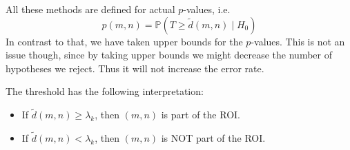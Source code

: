 \documentclass{beamer}
\begin{document}
\begin{frame}
	All these methods are defined for actual $p$-values, i.e.
	\begin{equation*}
		p(m, n) = \mathbb{P}(T \geq \tilde{d}(m, n) \mid H_0)
	\end{equation*}
	In contrast to that, we have taken upper bounds for the $p$-values. This is not an issue though, since by taking upper bounds we might decrease the number of hypotheses we reject. Thus it will not increase the error rate.
	
	The threshold has the following interpretation:
	\begin{itemize}
		\item If $\tilde{d}(m, n) \geq \lambda_{k}$, then $(m, n)$ is part of the ROI.
		\item If $\tilde{d}(m, n) < \lambda_{k}$, then $(m, n)$ is NOT part of the ROI.
	\end{itemize}
\end{frame}
\end{document}
